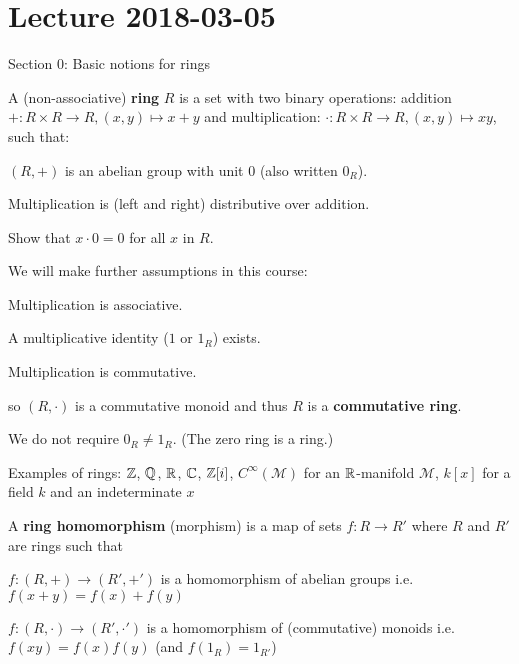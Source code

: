\section{Lecture 2018-03-05}

Section 0: Basic notions for rings

\begin{defn}
	A (non-associative) \textbf{ring} $R$ is a set with two binary operations: addition $+: R \times R \to R, (x,y) \mapsto x+y$ and multiplication: $\cdot: R \times R \to R, (x,y) \mapsto xy$, such that:
	\begin{enum}
		\item $(R,+)$ is an abelian group with unit $0$ (also written $0_R$).
		\item Multiplication is (left and right) distributive over addition.
	\end{enum}
\end{defn}

\begin{exer}
	Show that $x \cdot 0 = 0$ for all $x$ in $R$.
\end{exer}

\begin{rmk}
	We will make further assumptions in this course:
	\begin{enum}
		\item Multiplication is associative.
		\item A multiplicative identity ($1$ or $1_R$) exists.
		\item Multiplication is commutative.
	\end{enum}
	so $(R,\cdot)$ is a commutative monoid and thus $R$ is a \textbf{commutative ring}.
\end{rmk}

\begin{rmk}
	We do not require $0_R \neq 1_R$.
	(The zero ring is a ring.)
\end{rmk}

\begin{exam}
	Examples of rings: $\mathbb{Z}$, $\mathbb{Q}$, $\mathbb{R}$, $\mathbb{C}$, $\mathbb{Z}[i]$, $C^\infty(\mathcal{M})$ for an $\mathbb{R}$-manifold $\mathcal{M}$, $k[x]$ for a field $k$ and an indeterminate $x$
\end{exam}

\begin{defn}
	A \textbf{ring homomorphism} (morphism) is a map of sets $f: R \to R'$ where $R$ and $R'$ are rings such that
	\begin{enum}
		\item $f: (R,+) \to (R',+')$ is a homomorphism of abelian groups i.e.\@ $f(x+y)=f(x)+f(y)$
		\item $f: (R,\cdot) \to (R',\cdot')$ is a homomorphism of (commutative) monoids i.e.\@ $f(xy)=f(x)f(y)$ (and $f(1_R)=1_{R'}$)
	\end{enum}
\end{defn}

